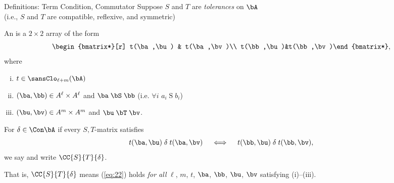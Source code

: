 \begin{frame}{Definitions: Term Condition, Commutator}
  Suppose $S$ and $T$ are \emph{tolerances} on $\bA$\\[4pt]
  {\small (i.e., $S$ and $T$ are compatible, reflexive, and symmetric)}

  \pause
  An  is a $2\times 2$ array of the form
  \[
  \begin{bmatrix*}[r] t(\ba,\bu) & t(\ba,\bv)\\ t(\bb,\bu)&t(\bb,\bv)\end{bmatrix*},
  \]
  where 
  \begin{enumerate}[(i)] %
  \item $t\in \sansClo_{\ell + m}(\bA)$
  \item $(\ba, \bb)\in A^\ell\times A^\ell$ and $\ba \mathrel{\bS} \bb$
    (i.e. $\forall i$ $a_i \mathrel{S} b_i$)
  \item $(\bu, \bv)\in A^m\times A^m$ and $\bu \mathrel{\bT} \bv$.
  \end{enumerate}

  \pause
  For $\delta \in \Con\bA$ if every $S,T$-matrix satisfies
  \begin{equation}
    \label{eq:22}
    t(\ba,\bu) \mathrel{\delta} t(\ba,\bv)\quad \iff \quad t(\bb,\bu) \mathrel{\delta} t(\bb,\bv),
  \end{equation}
  we say  and write 
  $\CC{S}{T}{\delta}$.

  That is, $\CC{S}{T}{\delta}$  means
  (\ref{eq:22}) holds \emph{for all}
  $\ell$, $m$, $t$, $\ba$, $\bb$, $\bu$, $\bv$ satisfying (i)--(iii).
\end{frame}









